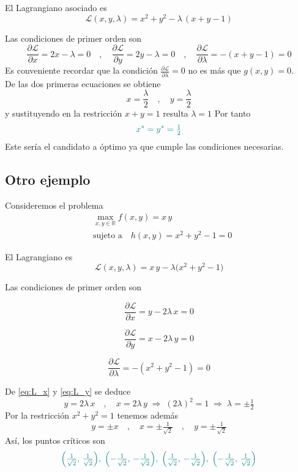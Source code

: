 \documentclass{article}
\begin{document}
El Lagrangiano asociado es  
\[
\mathcal{L}(x,y,\lambda)=x^2+y^2-\lambda\,(x+y-1)
\]

Las condiciones de primer orden son  
\[
\frac{\partial \mathcal{L}}{\partial x}=2x-\lambda=0
\quad,\quad
\frac{\partial \mathcal{L}}{\partial y}=2y-\lambda=0
\quad,\quad
\frac{\partial \mathcal{L}}{\partial \lambda}=-(x+y-1)=0
\]
Es conveniente recordar que la condición  $\frac{\partial \mathcal{L}}{\partial \lambda}=0$ no es más que $g(x,y)=0$.\\
De las dos primeras ecuaciones se obtiene  
\[
x=\frac{\lambda}{2}
\quad,\quad
y=\frac{\lambda}{2}
\]
y sustituyendo en la restricción \(x+y=1\) resulta \(\lambda=1\) Por tanto  
\[
{\color{teal}x^*=y^*=\tfrac12}
\]
Este sería el candidato a óptimo ya que cumple las condiciones necesarias.

\subsection*{Otro ejemplo}

Consideremos el problema  
\[
\begin{aligned}
&\max_{x,y\in\mathbb{R}} f(x,y)=x\,y\\
&\text{sujeto a}\quad h(x,y)=x^2+y^2-1=0
\end{aligned}
\]

El Lagrangiano es  
\[
\mathcal{L}(x,y,\lambda)=x\,y-\lambda\bigl(x^2+y^2-1\bigr)
\]

Las condiciones de primer orden son  

\begin{equation}
\frac{\partial \mathcal{L}}{\partial x}=y-2\lambda\,x=0
\label{eq:L_x}
\end{equation}

\begin{equation}
\frac{\partial \mathcal{L}}{\partial y}=x-2\lambda\,y=0
\label{eq:L_y}
\end{equation}

\begin{equation}
\frac{\partial \mathcal{L}}{\partial \lambda}=-(x^2+y^2-1)=0
\label{eq:L_lambda}
\end{equation}

De \eqref{eq:L_x} y \eqref{eq:L_y} se deduce  
\[
y=2\lambda\,x
\quad,\quad
x=2\lambda\,y
\;\Longrightarrow\;
(2\lambda)^2=1
\;\Longrightarrow\;
\lambda=\pm\tfrac12
\]
Por la restricción \(x^2+y^2=1\) tenemos además  
\[
y=\pm x
\quad,\quad
x=\pm\tfrac{1}{\sqrt2}
\quad,\quad
y=\pm\tfrac{1}{\sqrt2}
\]
Así, los puntos críticos son  
\[\color{teal}
\Bigl(\tfrac1{\sqrt2},\,\tfrac1{\sqrt2}\Bigr),\;
\Bigl(-\tfrac1{\sqrt2},\,-\tfrac1{\sqrt2}\Bigr),\;
\Bigl(\tfrac1{\sqrt2},\,-\tfrac1{\sqrt2}\Bigr),\;
\Bigl(-\tfrac1{\sqrt2},\,\tfrac1{\sqrt2}\Bigr)
\]
\end{document}
